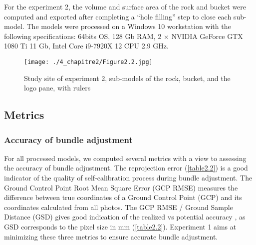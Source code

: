 For the experiment 2, the volume and surface area of the rock and bucket were computed and exported after completing a “hole filling” step to close each sub-model. The models were processed on a Windows 10 workstation with the following specifications: 64bits OS, 128 Gb RAM, 2 $\times$ NVIDIA GeForce GTX 1080 Ti 11 Gb, Intel Core i9-7920X 12 CPU 2.9 GHz.

\begin{figure}[H]
	\begin{center}
	\texttt{[image: ./4\_chapitre2/Figure2.2.jpg]}
		\caption[Study site of experiment 2]{Study site of experiment 2, sub-models of the rock, bucket, and the logo pane, with rulers}
	\label{figure2.2}
\end{center}
\end{figure}

\subsection{Metrics}\label{chapitre2_2.3}

\subsubsection{Accuracy of bundle adjustment}\label{chapitre2_2.3.1}
For all processed models, we computed several metrics with a view to assessing the accuracy of bundle adjustment. The reprojection error (\autoref{table2.2}) is a good indicator of the quality of self-calibration process during bundle adjustment. The Ground Control Point Root Mean Square Error (GCP RMSE) measures the difference between true coordinates of a Ground Control Point (GCP) and its coordinates calculated from all photos. The GCP RMSE / Ground Sample Distance (GSD) gives good indication of the realized vs potential accuracy \citep{forstner_photogrammetric_2016}, as GSD corresponds to the pixel size in mm (\autoref{table2.2}). Experiment 1 aims at minimizing these three metrics to ensure accurate bundle adjustment.


